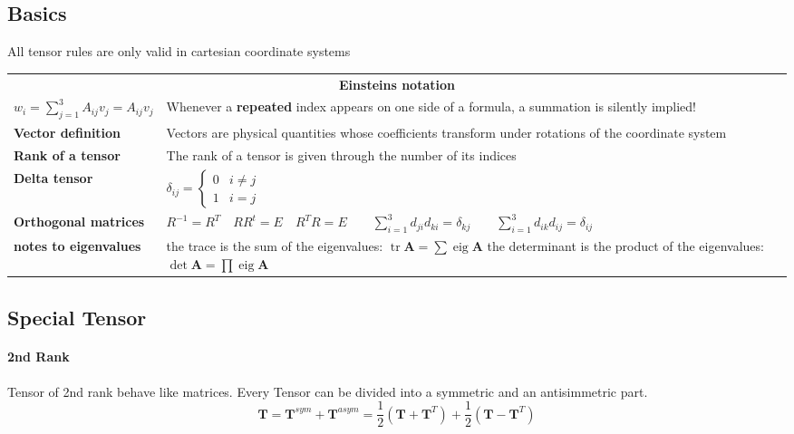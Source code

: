 	\subsection{Basics}
		All tensor rules are only valid in cartesian coordinate systems
		
		\begin{tabularx}{\columnwidth}{lX}
			\multicolumn{2}{c}{\textbf{Einsteins notation}}\\
			$w_i=\sum\limits_{j=1}^{3}A_{ij}v_j=A_{ij}v_j$ &	Whenever a \textbf{repeated} index appears on one side of a formula, a summation is silently implied!\\			
			\textbf{Vector definition}& Vectors are physical quantities whose  coefficients transform under rotations of the coordinate system\\
			\textbf{Rank of a tensor} & The rank of a tensor is given through the number of its indices\\
			\textbf{Delta tensor} & $\delta_{ij} = \begin{cases} 0 & i\neq j\\ 1 & i = j \end{cases}$\\
			\textbf{Orthogonal matrices} & $R^{-1} = R^T \quad RR^t = E \quad R^TR=E \qquad \sum\limits_{i=1}^3 d_{ji}d_{ki} = \delta_{kj} \qquad \sum\limits_{i=1}^3 d_{ik}d_{ij} = \delta_{ij}$\\
			\textbf{notes to eigenvalues} & the trace is the sum of the eigenvalues: $\operatorname{tr}\mathbf{A} = \sum \operatorname{eig}\mathbf{A}$ \newline 
			                                the determinant is the product of the eigenvalues: $\operatorname{det}\mathbf{A} = \prod \operatorname{eig}\mathbf{A}$  \\
		\end{tabularx}
	


	\subsection{Special Tensor}
	\paragraph{2nd Rank} Tensor of 2nd rank behave like matrices. Every Tensor can be divided into a symmetric and an antisimmetric part.
			$$\mathbf{T}=\mathbf{T}^{sym}+\mathbf{T}^{asym} = \frac{1}{2}\left(\mathbf{T}+\mathbf{T}^T\right) + \frac{1}{2}\left(\mathbf{T}-\mathbf{T}^T\right)$$
			
